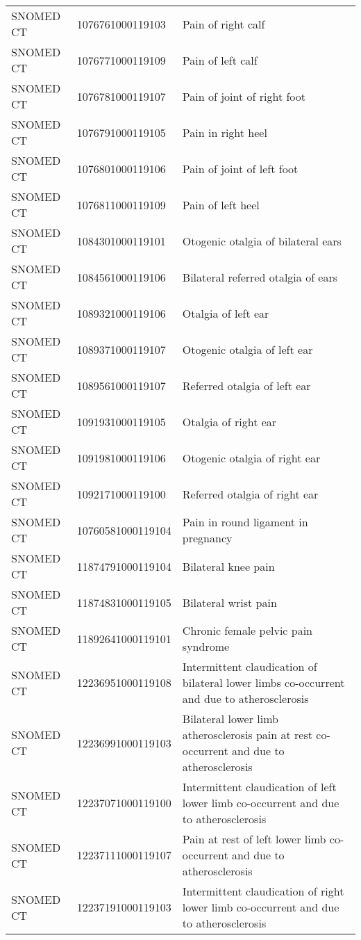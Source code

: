 \begin{longtable}{p{}p{}p{}}
  SNOMED CT & 1076761000119103 & Pain of right calf \\ 
  SNOMED CT & 1076771000119109 & Pain of left calf \\ 
  SNOMED CT & 1076781000119107 & Pain of joint of right foot \\ 
  SNOMED CT & 1076791000119105 & Pain in right heel \\ 
  SNOMED CT & 1076801000119106 & Pain of joint of left foot \\ 
  SNOMED CT & 1076811000119109 & Pain of left heel \\ 
  SNOMED CT & 1084301000119101 & Otogenic otalgia of bilateral ears \\ 
  SNOMED CT & 1084561000119106 & Bilateral referred otalgia of ears \\ 
  SNOMED CT & 1089321000119106 & Otalgia of left ear \\ 
  SNOMED CT & 1089371000119107 & Otogenic otalgia of left ear \\ 
  SNOMED CT & 1089561000119107 & Referred otalgia of left ear \\ 
  SNOMED CT & 1091931000119105 & Otalgia of right ear \\ 
  SNOMED CT & 1091981000119106 & Otogenic otalgia of right ear \\ 
  SNOMED CT & 1092171000119100 & Referred otalgia of right ear \\ 
  SNOMED CT & 10760581000119104 & Pain in round ligament in pregnancy \\ 
  SNOMED CT & 11874791000119104 & Bilateral knee pain \\ 
  SNOMED CT & 11874831000119105 & Bilateral wrist pain \\ 
  SNOMED CT & 11892641000119101 & Chronic female pelvic pain syndrome \\ 
  SNOMED CT & 12236951000119108 & Intermittent claudication of bilateral lower limbs co-occurrent and due to atherosclerosis \\ 
  SNOMED CT & 12236991000119103 & Bilateral lower limb atherosclerosis pain at rest co-occurrent and due to atherosclerosis \\ 
  SNOMED CT & 12237071000119100 & Intermittent claudication of left lower limb co-occurrent and due to atherosclerosis \\ 
  SNOMED CT & 12237111000119107 & Pain at rest of left lower limb co-occurrent and due to atherosclerosis \\ 
  SNOMED CT & 12237191000119103 & Intermittent claudication of right lower limb co-occurrent and due to atherosclerosis \\ 

\end{longtable}
